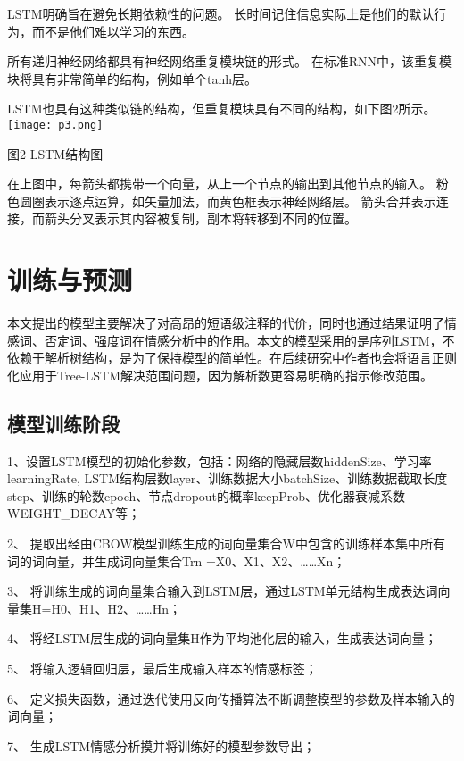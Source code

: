 \documentclass[twocolumn]{ctexart}
\begin{document}
\par LSTM明确旨在避免长期依赖性的问题。 长时间记住信息实际上是他们的默认行为，而不是他们难以学习的东西。

\par 所有递归神经网络都具有神经网络重复模块链的形式。 在标准RNN中，该重复模块将具有非常简单的结构，例如单个tanh层。

\par LSTM也具有这种类似链的结构，但重复模块具有不同的结构，如下图2所示。
\texttt{[image: p3.png]}
\caption{图2 LSTM结构图}

\par 在上图中，每箭头都携带一个向量，从上一个节点的输出到其他节点的输入。 粉色圆圈表示逐点运算，如矢量加法，而黄色框表示神经网络层。 箭头合并表示连接，而箭头分叉表示其内容被复制，副本将转移到不同的位置。




\section{训练与预测}
本文提出的模型主要解决了对高昂的短语级注释的代价，同时也通过结果证明了情感词、否定词、强度词在情感分析中的作用。本文的模型采用的是序列LSTM，不依赖于解析树结构，是为了保持模型的简单性。在后续研究中作者也会将语言正则化应用于Tree-LSTM解决范围问题，因为解析数更容易明确的指示修改范围。
\subsection{模型训练阶段}
\par 1、设置LSTM模型的初始化参数，包括：网络的隐藏层数hiddenSize、学习率learningRate, LSTM结构层数layer、训练数据大小batchSize、训练数据截取长度step、训练的轮数epoch、节点dropout的概率keepProb、优化器衰减系数WEIGHT_DECAY等；
\par 2、
提取出经由CBOW模型训练生成的词向量集合W中包含的训练样本集中所有词的词向量，并生成词向量集合Trn ={X0、X1、X2、……Xn}；

\par 3、
将训练生成的词向量集合输入到LSTM层，通过LSTM单元结构生成表达词向量集H={H0、H1、H2、……Hn}；
\par 4、
将经LSTM层生成的词向量集H作为平均池化层的输入，生成表达词向量；
\par 5、
将输入逻辑回归层，最后生成输入样本的情感标签；
\par 6、
定义损失函数，通过迭代使用反向传播算法不断调整模型的参数及样本输入的词向量；
\par 7、
生成LSTM情感分析摸并将训练好的模型参数导出；
\end{document}
